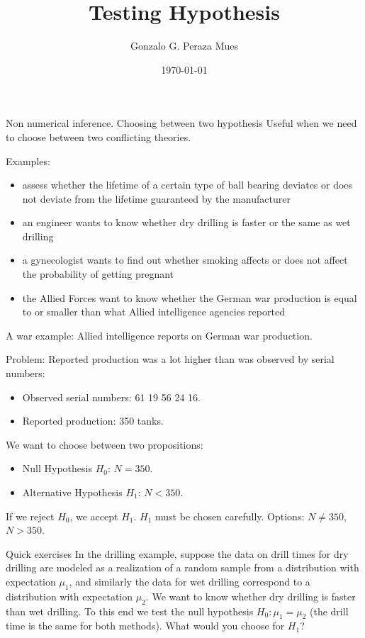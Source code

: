 \documentclass{beamer}
\title{Testing Hypothesis}
\date{\today}
\author{Gonzalo G. Peraza Mues}
\begin{document}
\maketitle
\begin{frame}{Non numerical inference. Choosing between two hypothesis}
  Useful when we need to choose between two conflicting theories.

  Examples:
  \begin{itemize}
  \item assess whether the lifetime of a certain type of ball bearing deviates
    or does not deviate from the lifetime guaranteed by the manufacturer
  \item an engineer wants to know whether dry drilling is faster or the same as
    wet drilling
  \item a gynecologist wants to find out whether smoking affects or does not
    affect the probability of getting pregnant
  \item the Allied Forces want to know whether the German war production is
    equal to or smaller than what Allied intelligence agencies reported
  \end{itemize}
\end{frame}

\begin{frame}{A war example: Allied intelligence reports on German war production.}

  Problem: Reported production was a lot higher than was observed by serial
  numbers:
  \begin{itemize}
  \item   Observed serial numbers: 61 19 56 24 16.
  \item   Reported production: 350 tanks.
  \end{itemize}


  We want to choose between two propositions:
  \begin{itemize}
  \item \alert{Null Hypothesis $H_0$}: $N=350$.
  \item \alert{Alternative Hypothesis $H_1$}: $N<350$.
  \end{itemize}
  If we reject $H_0$, we accept $H_1$. $H_1$ must be chosen carefully. Options:
  $N \neq 350$, $N > 350$.
\end{frame}

\begin{frame}[t]{Quick exercises}
  In the drilling example, suppose the data on drill times for dry drilling are
  modeled as a realization of a random sample from a distribution with
  expectation $\mu_1$, and similarly the data for wet drilling correspond to a
  distribution with expectation $\mu_2$. We want to know whether dry drilling is
  faster than wet drilling. To this end we test the null hypothesis
  $H_0 : \mu_1 = \mu_2$ (the drill time is the same for both methods). What
  would you choose for $H_1$?
\end{frame}
\end{document}
